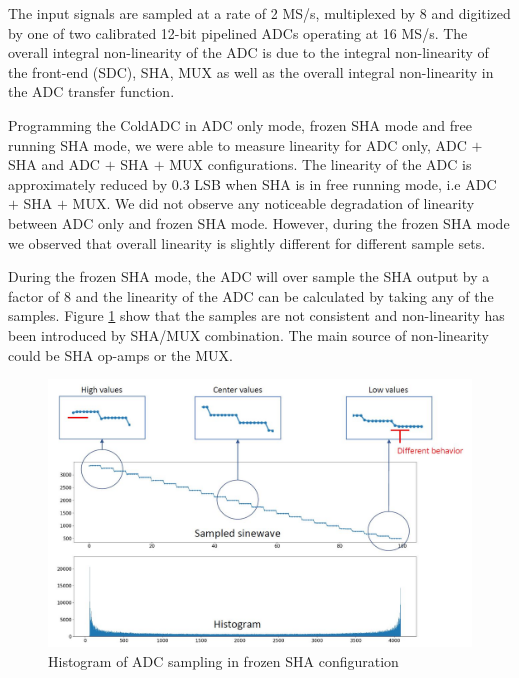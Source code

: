 \label{sec:5.4}


The input signals are sampled at a rate of 2 MS/s, multiplexed by 8 and digitized by one of two calibrated 12-bit pipelined ADCs operating at 16 MS/s. The overall integral non-linearity of the ADC is due to the integral non-linearity of the front-end (SDC), SHA, MUX as well as the overall integral non-linearity in the ADC transfer function. 

Programming the ColdADC in ADC only mode, frozen SHA mode and free running SHA mode, we were able to measure linearity for ADC only, ADC $+$ SHA and ADC $+$ SHA $+$ MUX configurations. The linearity of the ADC is approximately reduced by 0.3 LSB when SHA is in free running mode, i.e ADC $+$ SHA $+$ MUX. We did not observe any noticeable degradation of linearity between ADC only and frozen SHA mode. However, during the frozen SHA mode we observed that overall linearity is slightly different for different sample sets. 

During the frozen SHA mode, the ADC will over sample the SHA output by a factor of 8 and the linearity of the ADC can be calculated by taking any of the samples. Figure \ref{fig:sha_sample_hist} show that the samples are not consistent and non-linearity has been introduced by SHA/MUX combination. The main source of non-linearity could be SHA op-amps or the MUX.
\begin{figure}[h!]
\centering
  \includegraphics[width=0.7\linewidth]{figures/prakash_fig/sha_sample_hist.JPG}
  \caption{Histogram of ADC sampling in frozen SHA configuration}
  \label{fig:sha_sample_hist}
\end{figure}

